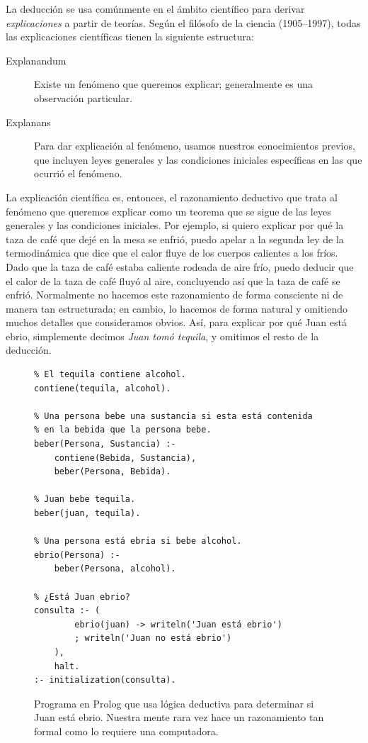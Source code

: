 La deducción se usa comúnmente en el ámbito científico para derivar \emph{explicaciones} a partir de teorías.
Según el filósofo de la ciencia  (1905--1997), todas las explicaciones científicas tienen la siguiente estructura\cite{Hempel1965}: \begin{description} \item[Explanandum] Existe un fenómeno que queremos explicar; generalmente es una observación particular.
	\item[Explanans] Para dar explicación al fenómeno, usamos nuestros conocimientos previos, que incluyen leyes generales y las condiciones iniciales específicas en las que ocurrió el fenómeno.
\end{description}

La explicación científica es, entonces, el razonamiento deductivo que trata al fenómeno que queremos explicar como un teorema que se sigue de las leyes generales y las condiciones iniciales.
Por ejemplo, si quiero explicar por qué la taza de café que dejé en la mesa se enfrió, puedo apelar a la segunda ley de la termodinámica que dice que el calor fluye de los cuerpos calientes a los fríos.
Dado que la taza de café estaba caliente rodeada de aire frío, puedo deducir que el calor de la taza de café fluyó al aire, concluyendo así que la taza de café se enfrió.
Normalmente no hacemos este razonamiento de forma consciente ni de manera tan estructurada; en cambio, lo hacemos de forma natural y omitiendo muchos detalles que consideramos obvios.
Así, para explicar por qué Juan está ebrio, simplemente decimos \emph{Juan tomó tequila}, y omitimos el resto de la deducción.

\begin{figure}
	\centering
	\begin{verbatim}
% El tequila contiene alcohol.
contiene(tequila, alcohol).

% Una persona bebe una sustancia si esta está contenida
% en la bebida que la persona bebe.
beber(Persona, Sustancia) :-
    contiene(Bebida, Sustancia),
    beber(Persona, Bebida).

% Juan bebe tequila.
beber(juan, tequila).

% Una persona está ebria si bebe alcohol.
ebrio(Persona) :-
    beber(Persona, alcohol).

% ¿Está Juan ebrio?
consulta :- (
        ebrio(juan) -> writeln('Juan está ebrio')
        ; writeln('Juan no está ebrio')
    ),
    halt.
:- initialization(consulta).
\end{verbatim}
	\caption{Programa en Prolog que usa lógica deductiva para determinar si Juan está ebrio.
		Nuestra mente rara vez hace un razonamiento tan formal como lo requiere una computadora.}
\end{figure}

